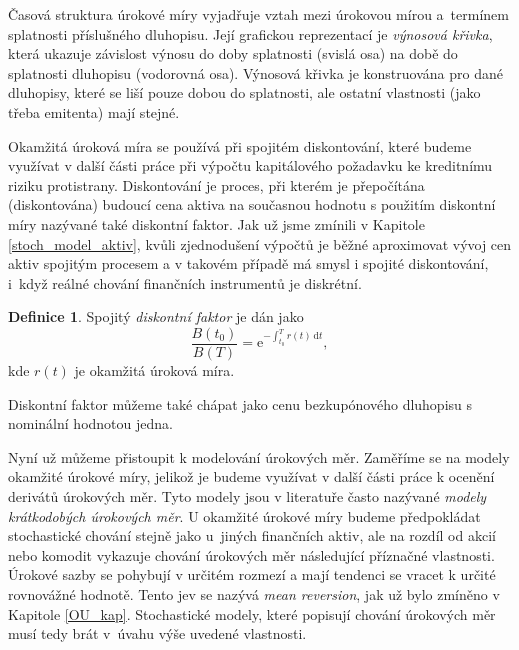 \documentclass[a4paper,12pt]{report}
\theoremstyle{definition} \newtheorem{definice}[veta]{Definice}
\theoremstyle{remark}
\begin{document}
Časová struktura úrokové míry vyjadřuje vztah mezi úrokovou mírou a~termínem splatnosti příslušného dluhopisu.
Její grafickou reprezentací je \textit{výnosová křivka}, která ukazuje závislost výnosu do doby splatnosti (svislá osa) na době do splatnosti dluhopisu (vodorovná osa). 
Výnosová křivka je konstruována pro dané dluhopisy, které se liší pouze dobou do splatnosti, ale ostatní vlastnosti (jako třeba emitenta) mají stejné.


Okamžitá úroková míra se používá při spojitém diskontování, které budeme využívat v další části práce při výpočtu kapitálového požadavku ke kreditnímu riziku protistrany. 
Diskontování je proces, při kterém je přepočítána (diskontována) budoucí cena aktiva na současnou hodnotu s použitím diskontní míry nazývané také diskontní faktor.
Jak už jsme zmínili v Kapitole \ref{stoch_model_aktiv}, kvůli zjednodušení výpočtů je běžné aproximovat vývoj cen aktiv spojitým procesem a v takovém případě má smysl i spojité diskontování, i~když reálné chování finančních instrumentů je diskrétní.
\begin{definice}
Spojitý \textit{diskontní faktor} je dán jako
\begin{equation}\label{diskontni_faktor}
\frac{B(t_0)}{B(T)}=\mathrm{e}^{-\int_{t_0}^T r(t)\,\mathrm{d}t},
\end{equation}
kde $r(t)$ je okamžitá úroková míra.
\end{definice}
Diskontní faktor můžeme také chápat jako cenu bezkupónového dluhopisu s nominální hodnotou jedna.

Nyní už můžeme přistoupit k modelování úrokových měr.
Zaměříme se na modely okamžité úrokové míry, jelikož je budeme využívat v další části práce k ocenění derivátů úrokových měr.
Tyto modely jsou v literatuře často nazývané \textit{modely krátkodobých úrokových měr}.
U okamžité úrokové míry budeme předpokládat stochastické chování stejně jako u~jiných finančních aktiv,
ale na rozdíl od akcií nebo komodit vykazuje chování úrokových měr následující příznačné vlastnosti. %
Úrokové sazby se pohybují v určitém rozmezí a %
mají tendenci se vracet k určité rovnovážné hodnotě.
Tento jev se nazývá \textit{mean reversion}, jak už bylo zmíněno v Kapitole \ref{OU_kap}. %
Stochastické modely, které popisují chování úrokových měr musí tedy brát v~úvahu výše uvedené vlastnosti.
\end{document}
